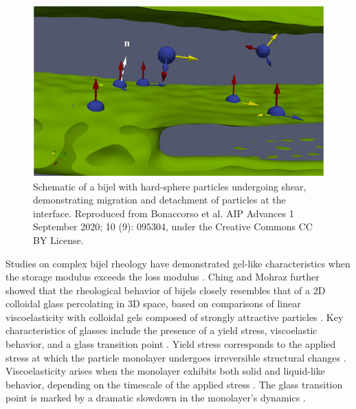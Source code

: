 \begin{figure}
    \centering
    \includegraphics[scale = 3]{figures/literature_review/bijel_under_shear.jpeg}
    \caption{Schematic of a bijel with hard-sphere particles undergoing shear, demonstrating migration and detachment of 
             particles at the interface. \cite{bonaccorso_shear_2020} Reproduced from Bonaccorso et al. AIP Advances 1 
             September 2020; 10 (9): 095304, under the Creative Commons CC BY License.}
    \label{fig:bijel_under_shear}
\end{figure} 

Studies on complex bijel rheology have demonstrated gel-like characteristics when the storage modulus exceeds the loss modulus \cite{lee_making_2013, bai_dynamics_2015}. 
Ching and Mohraz further showed that the rheological behavior of bijels closely resembles that of a 2D colloidal glass percolating in 3D space, based on comparisons of 
linear viscoelasticity with colloidal gels composed of strongly attractive particles \cite{ching_bijel_2022}. Key characteristics of glasses include the presence of a 
yield stress, viscoelastic behavior, and a glass transition point \cite{pham_yielding_2008, weeks_introduction_2017}. Yield stress corresponds to the applied stress at 
which the particle monolayer undergoes irreversible structural changes \cite{pham_yielding_2008}. Viscoelasticity arises when the monolayer exhibits both solid and 
liquid-like behavior, depending on the timescale of the applied stress \cite{pham_yielding_2008}. The glass transition point is marked by a dramatic slowdown in the 
monolayer's dynamics \cite{weeks_introduction_2017}. 



